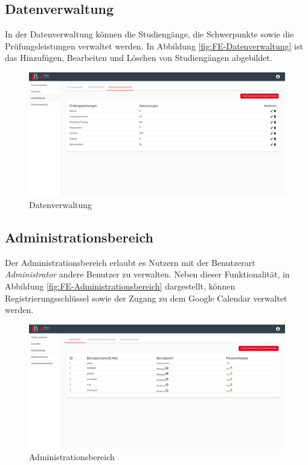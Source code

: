 \subsection{Datenverwaltung}
In der Datenverwaltung können die Studiengänge, die Schwerpunkte sowie die Prüfungsleistungen verwaltet werden.
In Abbildung \vref{fig:FE-Datenverwaltung} ist das Hinzufügen, Bearbeiten und Löschen von Studiengängen abgebildet.
\begin{figure}[H]
	\centering 
	\includegraphics[width=\textwidth]{img/FrontEnd/Datenverwaltung.png}
	\caption[Datenverwaltung]{\label{fig:FE-Datenverwaltung}Datenverwaltung}
\end{figure}

\subsection{Administrationsbereich}
Der Administrationsbereich erlaubt es Nutzern mit der Benutzerart \textit{Administrator} andere Benutzer zu verwalten.
Neben dieser Funktionalität, in Abbildung \vref{fig:FE-Administrationsbereich} dargestellt, können Registrierungsschlüssel sowie der Zugang zu dem Google Calendar verwaltet werden.
\begin{figure}[H]
	\centering 
	\includegraphics[width=\textwidth]{img/FrontEnd/Administrationsbereich.png}
	\caption[Administrationsbereich]{\label{fig:FE-Administrationsbereich}Administrationsbereich}
\end{figure}

